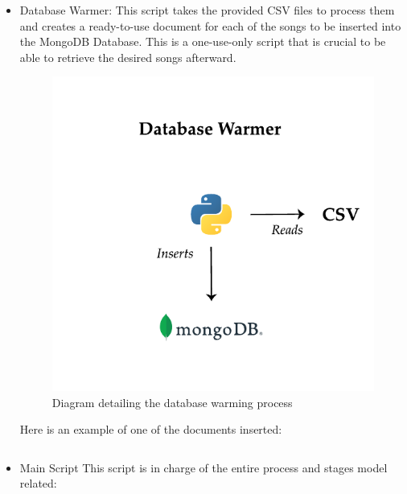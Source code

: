 \begin{itemize}
    \item Database Warmer: This script takes the provided CSV files to process them and creates a ready-to-use document for each of the songs to be inserted into the MongoDB Database. This is a one-use-only script that is crucial to be able to retrieve the desired songs afterward.
    \begin{figure}[th]
        \centering
        \includegraphics{Figures/DatabaseWarmer}
        \decoRule
        \caption[Database Warmer Script]{Diagram detailing the database warming process}
        \label{fig:Database Warmer Script}
    \end{figure}


    Here is an example of one of the documents inserted:
    \begin{lstlisting}[caption=Song JSON document]

    \end{lstlisting}

    
    \item Main Script This script is in charge of the entire process and stages model related:
    \begin{enumerate}
        

\end{enumerate}
\end{itemize}
